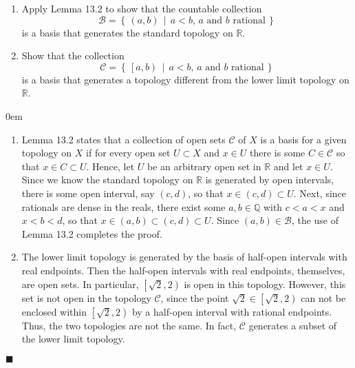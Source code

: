 \documentclass[12pt]{article}
\renewcommand{\qed}{\hfill$\blacksquare$}
\renewenvironment{proof}{\begin{addmargin}[1em]{0em}\begin{newproof}}{\end{newproof}\end{addmargin}\qed}
\newenvironment{problem}[2][Exercise]{\begin{trivlist}
\item[\hskip \labelsep {\bfseries #1}\hskip \labelsep {\bfseries #2.}]}{\end{trivlist}}
\begin{document}
\begin{problem}{13.8}
\begin{enumerate}[label=(\alph*)]
	\item Apply Lemma 13.2 to show that the countable collection $$ \mathcal{B} = \left\{\,\left(a,b\right)\, \middle| \, a<b,\, a \text{ and } b \text{ rational}\,\right\}$$ is a basis that generates the standard topology on $\mathbb{R}$.
	\item Show that the collection $$ \mathcal{C} = \left\{ \, \left[a,b\right) \, \middle| \, a<b, \, a \text{ and } b \text{ rational}\,\right\}$$ is a basis that generates a topology different from the lower limit topology on $\mathbb{R}$.
\end{enumerate}
\end{problem}
\begin{proof}
\begin{enumerate}[label=(\alph*)]
	\item Lemma 13.2 states that a collection of open sets $\mathcal{C}$ of $X$ is a basis for a given topology on $X$ if for every open set $U\subset X$ and $x\in U$ there is some $C \in \mathcal{C}$ so that $x \in C \subset U$. Hence, let $U$ be an arbitrary open set in $\mathbb{R}$ and let $x \in U$. Since we know the standard topology on $\mathbb{R}$ is generated by open intervals, there is some open interval, say $\left(c,d\right)$, so that $x \in \left(c,d\right) \subset U$. Next, since rationals are dense in the reals, there exist some $a,b\in \mathbb{Q}$ with $c < a < x$ and $x < b < d$, so that $x \in \left(a,b\right) \subset \left(c,d\right)\subset U$. Since $\left(a,b\right) \in \mathcal{B}$, the use of Lemma 13.2 completes the proof.
	
	\item The lower limit topology is generated by the basis of half-open intervals with real endpoints. Then the half-open intervals with real endpoints, themselves, are open sets. In particular, $\left[\sqrt{2},2\right)$ is open in this topology. However, this set is not open in the topology $\mathcal{C}$, since the point $\sqrt{2}\in \left[\sqrt{2},2\right)$ can not be enclosed within $\left[\sqrt{2},2\right)$ by a half-open interval with rational endpoints. Thus, the two topologies are not the same. {\color{red}In fact, $\mathcal{C}$ generates a subset of the lower limit topology.}
\end{enumerate}
\end{proof}
\end{document}
